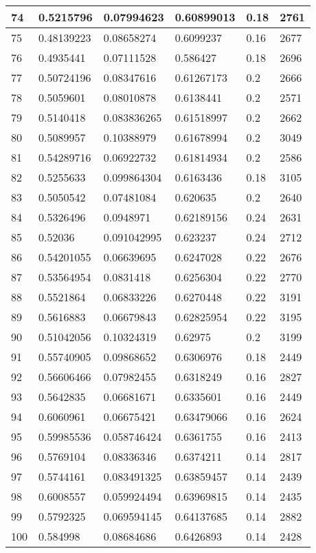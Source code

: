 \begin{longtable}{|l|l|l|l|l|l|}
74 & 0.5215796 & 0.07994623 & 0.60899013 & 0.18 & 2761 \\ \hline 
75 & 0.48139223 & 0.08658274 & 0.6099237 & 0.16 & 2677 \\ \hline 
76 & 0.4935441 & 0.07111528 & 0.586427 & 0.18 & 2696 \\ \hline 
77 & 0.50724196 & 0.08347616 & 0.61267173 & 0.2 & 2666 \\ \hline 
78 & 0.5059601 & 0.08010878 & 0.6138441 & 0.2 & 2571 \\ \hline 
79 & 0.5140418 & 0.083836265 & 0.61518997 & 0.2 & 2662 \\ \hline 
80 & 0.5089957 & 0.10388979 & 0.61678994 & 0.2 & 3049 \\ \hline 
81 & 0.54289716 & 0.06922732 & 0.61814934 & 0.2 & 2586 \\ \hline 
82 & 0.5255633 & 0.099864304 & 0.6163436 & 0.18 & 3105 \\ \hline 
83 & 0.5050542 & 0.07481084 & 0.620635 & 0.2 & 2640 \\ \hline 
84 & 0.5326496 & 0.0948971 & 0.62189156 & 0.24 & 2631 \\ \hline 
85 & 0.52036 & 0.091042995 & 0.623237 & 0.24 & 2712 \\ \hline 
86 & 0.54201055 & 0.06639695 & 0.6247028 & 0.22 & 2676 \\ \hline 
87 & 0.53564954 & 0.0831418 & 0.6256304 & 0.22 & 2770 \\ \hline 
88 & 0.5521864 & 0.06833226 & 0.6270448 & 0.22 & 3191 \\ \hline 
89 & 0.5616883 & 0.06679843 & 0.62825954 & 0.22 & 3195 \\ \hline 
90 & 0.51042056 & 0.10324319 & 0.62975 & 0.2 & 3199 \\ \hline 
91 & 0.55740905 & 0.09868652 & 0.6306976 & 0.18 & 2449 \\ \hline 
92 & 0.56606466 & 0.07982455 & 0.6318249 & 0.16 & 2827 \\ \hline 
93 & 0.5642835 & 0.06681671 & 0.6335601 & 0.16 & 2449 \\ \hline 
94 & 0.6060961 & 0.06675421 & 0.63479066 & 0.16 & 2624 \\ \hline 
95 & 0.59985536 & 0.058746424 & 0.6361755 & 0.16 & 2413 \\ \hline 
96 & 0.5769104 & 0.08336346 & 0.6374211 & 0.14 & 2817 \\ \hline 
97 & 0.5744161 & 0.083491325 & 0.63859457 & 0.14 & 2439 \\ \hline 
98 & 0.6008557 & 0.059924494 & 0.63969815 & 0.14 & 2435 \\ \hline 
99 & 0.5792325 & 0.069594145 & 0.64137685 & 0.14 & 2882 \\ \hline 
100 & 0.584998 & 0.08684686 & 0.6426893 & 0.14 & 2428 \\ \hline 
\end{longtable}